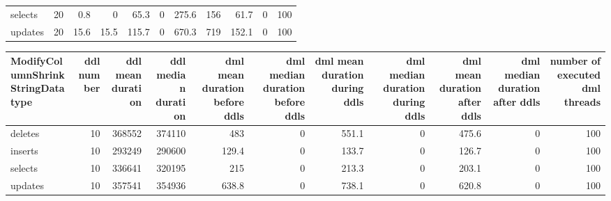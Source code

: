 \begin{tabular}{lrrrrrrrrrr}
 selects                              &           20 &                 0.8 &                   0   &                            65.3 &                                 0 &                           275.6 &                             156   &                           61.7 &                                0 &                              100 \\
 updates                              &           20 &                15.6 &                  15.5 &                           115.7 &                                 0 &                           670.3 &                             719   &                          152.1 &                                0 &                              100 \\
\hline
\end{tabular}\begin{tabular}{lrrrrrrrrrr}
\hline
 ModifyColumnShrinkStringDatatype   &   ddl number &   ddl mean duration &   ddl median duration &   dml mean duration before ddls &   dml median duration before ddls &   dml mean duration during ddls &   dml median duration during ddls &   dml mean duration after ddls &   dml median duration after ddls &   number of executed dml threads \\
\hline
 deletes                            &           10 &              368552 &                374110 &                           483   &                                 0 &                           551.1 &                                 0 &                          475.6 &                                0 &                              100 \\
 inserts                            &           10 &              293249 &                290600 &                           129.4 &                                 0 &                           133.7 &                                 0 &                          126.7 &                                0 &                              100 \\
 selects                            &           10 &              336641 &                320195 &                           215   &                                 0 &                           213.3 &                                 0 &                          203.1 &                                0 &                              100 \\
 updates                            &           10 &              357541 &                354936 &                           638.8 &                                 0 &                           738.1 &                                 0 &                          620.8 &                                0 &                              100 \\

\end{tabular}
